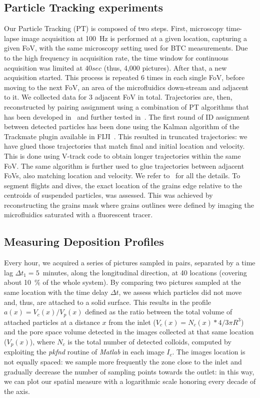 \documentclass[singlecolumn,pre,notitlepage,preprintnumbers,floatfix,superscriptaddress]{revtex4-1}
\begin{document}
\subsection*{Particle Tracking experiments}
\noindent
Our Particle Tracking (PT) is composed of two steps. First, microscopy time-lapse image acquisition at 100~Hz is performed at a given location, capturing a given FoV, with the same microscopy setting used for BTC measurements. Due to the high frequency in acquisition rate, the time window for continuous acquisition was limited at $40 sec$ (thus, 4,000 pictures). After that, a new acquisition started. This process is repeated 6 times in each single FoV, before moving to the next FoV, an area of the microfluidics down-stream and adjacent to it. We collected data for 3 adjacent FoV in total. Trajectories are, then, reconstructed by pairing assignment using a combination of PT algorithms that has been developed in~\cite{morales_stochastic_2017} and further tested in~\cite{berghouse_PT_SciRep2024}. The first round of ID assignment between detected particles has been done using the Kalman algorithm of the Trackmate plugin available in FIJI~\cite{schneider_nih_2012}. This resulted in truncated trajectories: we have glued those trajectories that match final and initial location and velocity. This is done using V-track code to obtain longer trajectories within the same FoV. The same algorithm is further used to glue trajectories between adjacent FoVs, also matching location and velocity. We refer to~\cite{berghouse_PT_SciRep2024} for all the details. To segment flights and dives, the exact location of the grains edge relative to the centroids of suspended particles, was assessed. This was achieved by reconstructing the grains mask where grains outlines were defined by imaging the microfluidics saturated with a fluorescent tracer.\\

\subsection*{Measuring Deposition Profiles}
\noindent
Every hour, we acquired a series of pictures sampled in pairs, separated by a time lag $\Delta t_1 = 5$~minutes, along the longitudinal direction, at 40 locations (covering about 10~\% of the whole system). By comparing two pictures sampled at the same location with the time delay $\Delta t$, we assess which particles did not move and, thus, are attached to a solid surface. This results in the profile $a(x) = V_c(x) / V_p(x)$ defined as the ratio between the total volume of attached particles at a distance $x$ from the inlet ($V_c(x) = N_c(x)*4/3\pi R^3$) and the pore space volume detected in the images collected at that same location ($V_p(x)$), where $N_c$ is the total number of detected colloids, computed by exploiting the \emph{pkfnd} routine of \emph{Matlab} in each image $I_c$. The images location is not equally spaced: we sample more frequently the zone close to the inlet and gradually decrease the number of sampling points towards the outlet: in this way, we can plot our spatial measure with a logarithmic scale honoring every decade of the axis. \\
\end{document}
